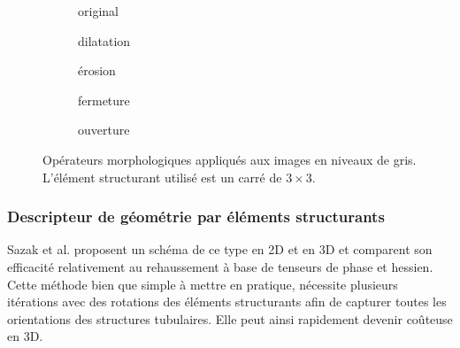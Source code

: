  \begin{figure}
  \begin{subfigure}[t]{0.30\textwidth}
    \centering
    \caption{original}
  \end{subfigure}
  \begin{subfigure}[t]{0.30\textwidth}
    \centering
    \caption{dilatation}
  \end{subfigure}
  \begin{subfigure}[t]{0.30\textwidth}
    \centering
    \caption{érosion}
  \end{subfigure}
  \centering
  \begin{subfigure}[t]{0.30\textwidth}
    \centering
    \caption{fermeture}
  \end{subfigure}
  \begin{subfigure}[t]{0.30\textwidth}
    \centering
    \caption{ouverture}
  \end{subfigure}  
  \caption{Opérateurs morphologiques appliqués aux images en niveaux de gris. L'élément structurant utilisé est un carré de $3\times3$.}
  \label{fig:greyscale_morpho}
\end{figure}

\subsubsection{Descripteur de géométrie par éléments structurants}
\label{sec:EA:rehaussement:morpho}

 Sazak et al. proposent un schéma de ce type en 2D \cite{Sazak2019_bowler_hat_2D} et en 3D \cite{Sazak2018_bowler_hat_3D} et comparent son efficacité relativement au rehaussement à base de tenseurs de phase et hessien. Cette méthode bien que simple à mettre en pratique, nécessite plusieurs itérations avec des rotations des éléments structurants afin de capturer toutes les orientations des structures tubulaires. Elle peut ainsi rapidement devenir coûteuse en 3D.

